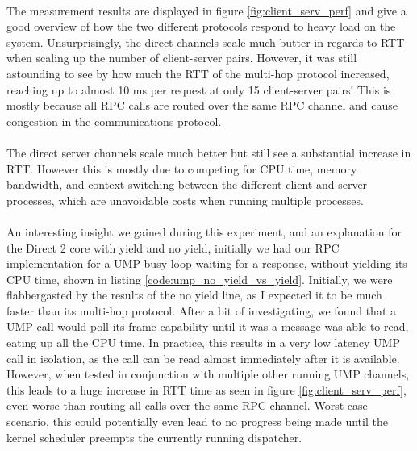 \paragraph{}
The measurement results are displayed in figure \ref{fig:client_serv_perf} and give a good overview of how the two different protocols respond to heavy load on the system. Unsurprisingly, the direct channels scale much butter in regards to RTT when scaling up the number of client-server pairs. However, it was still astounding to see by how much the RTT of the multi-hop protocol increased, reaching up to almost 10 ms per request at only 15 client-server pairs! This is mostly because all RPC calls are routed over the same RPC channel and cause congestion in the communications protocol. 
\paragraph{}
The direct server channels scale much better but still see a substantial increase in RTT. However this is mostly due to competing for CPU time, memory bandwidth, and context switching between the different client and server processes, which are unavoidable costs when running multiple processes.
\paragraph{}
An interesting insight we gained during this experiment, and an explanation for the Direct 2 core with yield and no yield, initially we had our RPC implementation for a UMP busy loop waiting for a response, without yielding its CPU time, shown in listing \ref{code:ump_no_yield_vs_yield}. Initially, we were flabbergasted by the results of the no yield line, as I expected it to be much faster than its multi-hop protocol. After a bit of investigating, we found that a UMP call would poll its frame capability until it was a message was able to read, eating up all the CPU time. In practice, this results in a very low latency UMP call in isolation, as the call can be read almost immediately after it is available. However, when tested in conjunction with multiple other running UMP channels, this leads to a huge increase in RTT time as seen in figure \ref{fig:client_serv_perf}, even worse than routing all calls over the same RPC channel. Worst case scenario, this could potentially even lead to no progress being made until the kernel scheduler preempts the currently running dispatcher. 

